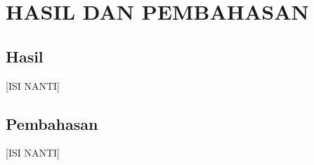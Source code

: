 \chapter{HASIL DAN PEMBAHASAN}\label{hasil-pembahasan}

\section{Hasil}\label{hasil}
[ISI NANTI]

\section{Pembahasan}\label{pembahasan}
[ISI NANTI]
